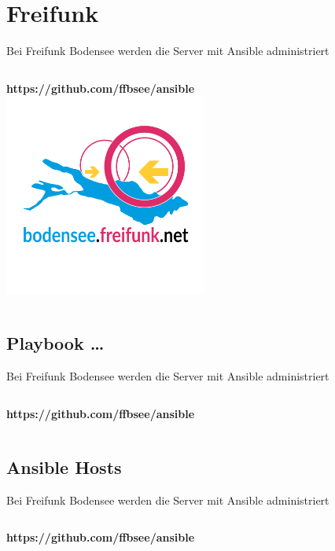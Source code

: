 \documentclass[aspectratio=169]{beamer}
\begin{document}
\section{Freifunk} 
\begin{frame}{Bei Freifunk Bodensee werden die Server mit Ansible administriert}
    \begin{columns}
        \begin{column}{1.0\textwidth}
            \centering
            \textbf{https://github.com/ffbsee/ansible} \\
            \includegraphics[width=0.5\textwidth]{ffbsee.png}
        \end{column}
    \end{columns}
\end{frame}

\subsection{Playbook \ldots} 
\begin{frame}{Bei Freifunk Bodensee werden die Server mit Ansible administriert}
    \begin{columns}
        \begin{column}{1.0\textwidth}
            \centering
            \textbf{https://github.com/ffbsee/ansible} \\
        
        \end{column}
    \end{columns}
\end{frame}

\subsection{Ansible Hosts} 
\begin{frame}{Bei Freifunk Bodensee werden die Server mit Ansible administriert}
    \begin{columns}
        \begin{column}{1.0\textwidth}
            \centering
            \textbf{https://github.com/ffbsee/ansible} \\
        
        \end{column}
    \end{columns}
\end{frame}
\end{document}
